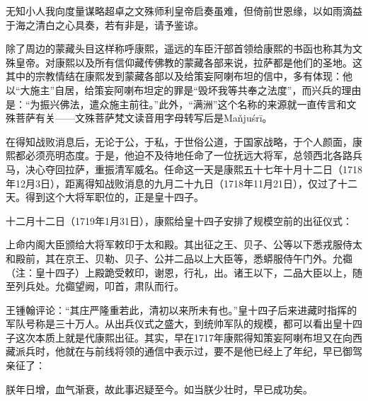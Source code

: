 
\begin{bookquote}无知小人我向度量谋略超卓之文殊师利皇帝启奏虽难，但倚前世恩缘，以如雨滴益于海之清白之心具奏，若有非是，请予鉴谅。\end{bookquote}


除了周边的蒙藏头目这样称呼康熙，遥远的车臣汗部首领给康熙的书函也称其为文殊皇帝。对康熙以及所有信仰藏传佛教的蒙藏各部来说，拉萨都是他们的圣地。这其中的宗教情结在康熙发到蒙藏各部以及给策妄阿喇布坦的信中，多有体现：他以“大施主”自居，给策妄阿喇布坦定的罪是“毁坏我等共奉之法度”，而兴兵的理由是：“为振兴佛法，遣众施主前往。”此外，“满洲”这个名称的来源就一直传言和文殊菩萨有关——文殊菩萨梵文读音用字母转写后是Maňjuśrī。



在得知战败消息后，无论于公，于私，于世俗公道，于国家战略，于个人颜面，康熙都必须亮明态度。于是，他迫不及待地任命了一位抚远大将军，总领西北各路兵马，决心夺回拉萨，重振清军威名。任命这一天是康熙五十七年十月十二日（1718年12月3日），距离得知战败消息的九月二十九日（1718年11月21日），仅过了十二天。得到这个大将军职位的，正是皇十四子。



十二月十二日（1719年1月31日），康熙给皇十四子安排了规模空前的出征仪式：



\begin{bookquote}上命内阁大臣颁给大将军敕印于太和殿。其出征之王、贝子、公等以下悉戎服侍太和殿前，其在京王、贝勒、贝子、公并二品以上大臣等，悉蟒服侍午门外。允禵（注：皇十四子）上殿跪受敕印，谢恩，行礼，出。诸王以下，二品大臣以上，随至列兵处。允禵望阙，叩首，肃队而行。\end{bookquote}


王锺翰评论：“其庄严隆重若此，清初以来所未有也。”皇十四子后来进藏时指挥的军队号称是三十万人。从出兵仪式之盛大，到统帅军队的规模，都可以看出皇十四子这次本质上就是代康熙出征。其实，早在1717年康熙得知策妄阿喇布坦又在向西藏派兵时，他就在与前线将领的通信中表示过，要不是他已经上了年纪，早已御驾亲征了：



\begin{bookquote}朕年日增，血气渐衰，故此事迟疑至今。如当朕少壮时，早已成功矣。\end{bookquote}

